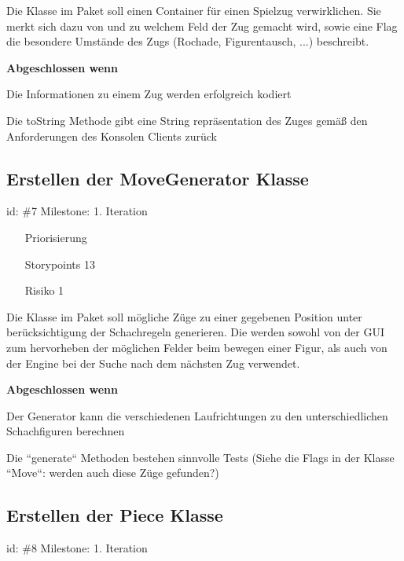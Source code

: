 Die  Klasse im Paket  soll einen Container für einen Spielzug verwirklichen. Sie merkt sich dazu von und zu welchem Feld der Zug gemacht wird, sowie eine Flag die besondere Umstände des Zugs (Rochade, Figurentausch, ...) beschreibt.

\textbf{Abgeschlossen wenn}
\begin{todolist}
    \item[\done]  Die Informationen zu einem Zug werden erfolgreich kodiert
  \item[\done]  Die toString Methode gibt eine String repräsentation des Zuges gemäß den Anforderungen des Konsolen Clients zurück

\end{todolist}

\subsection*{Erstellen der MoveGenerator Klasse}
id: \#7 Milestone: 1. Iteration\\

\begin{itemize}
\item[Priorisierung] 
\item[Storypoints] 13
\item[Risiko] 1
\end{itemize}

Die  Klasse im Paket  soll mögliche Züge zu einer gegebenen Position unter berücksichtigung der Schachregeln generieren. Die werden sowohl von der GUI zum hervorheben der möglichen Felder beim bewegen einer Figur, als auch von der Engine bei der Suche nach dem nächsten Zug verwendet.

\textbf{Abgeschlossen wenn}
\begin{todolist}
    \item[\done]  Der Generator kann die verschiedenen Laufrichtungen zu den unterschiedlichen Schachfiguren berechnen
  \item[\done]  Die ``generate`` Methoden bestehen sinnvolle Tests (Siehe die Flags in der Klasse ``Move``: werden auch diese Züge gefunden?)

\end{todolist}

\subsection*{Erstellen der Piece Klasse}
id: \#8 Milestone: 1. Iteration\\

